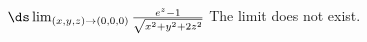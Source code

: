 {$\ds \lim_{(x,y,z)\to(0,0,0)} \frac{e^z - 1}{\sqrt{x^2 + y^2 + 2z^2}}$
}
{The limit does not exist.
}